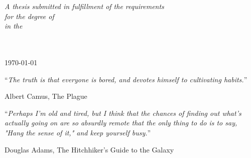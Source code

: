 \documentclass[
11pt, %
english, %
singlespacing, %
headsepline, %
]{MastersDoctoralThesis} %
\begin{document}
\begin{titlepage}
\begin{center}
\vfill

\large \textit{
  A thesis submitted in fulfillment of the requirements\\ for the degree of \degreename%
}\\[0.3cm] %
\textit{in the}\\[0.4cm]
\groupname\\%
\deptname\\[1.3cm] %

\vfill

{\large \today}\\[8mm] %

\vfill
\end{center}
\end{titlepage}


\cleardoublepage


\vspace*{0.2\textheight}

\noindent\enquote{\itshape The truth is that everyone is bored, and devotes himself to
cultivating habits.}\bigbreak

\hfill Albert Camus, The Plague

\vspace{2cm}

\noindent\enquote{\itshape Perhaps I'm old and tired, but I think that the chances of
finding out what's actually going on are so absurdly remote that the only thing to do
is to say, "Hang the sense of it," and keep yourself busy.}\bigbreak

\hfill Douglas Adams, The Hitchhiker's Guide to the Galaxy


\end{document}
